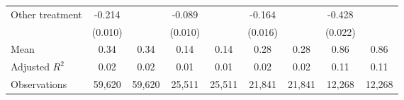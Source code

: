 {\begin{tabular}{l*{8}{c}}
Other treatment     &      -0.214\sym{***}&                     &      -0.089\sym{***}&                     &      -0.164\sym{***}&                     &      -0.428\sym{***}&                     \\
                    &     (0.010)         &                     &     (0.010)         &                     &     (0.016)         &                     &     (0.022)         &                     \\
\hline
Mean                &        0.34         &        0.34         &        0.14         &        0.14         &        0.28         &        0.28         &        0.86         &        0.86         \\
Adjusted \(R^{2}\)  &        0.02         &        0.02         &        0.01         &        0.01         &        0.02         &        0.02         &        0.11         &        0.11         \\
Observations        &      59,620         &      59,620         &      25,511         &      25,511         &      21,841         &      21,841         &      12,268         &      12,268         \\
\hline\hline
\end{tabular}
}
